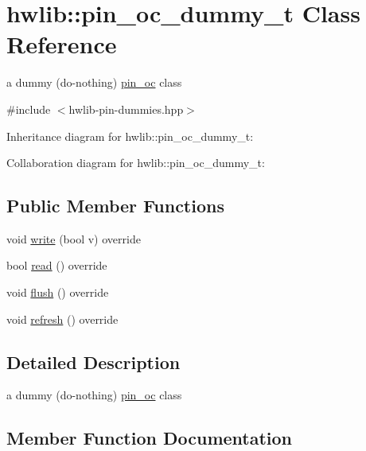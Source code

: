 \hypertarget{classhwlib_1_1pin__oc__dummy__t}{}\section{hwlib\+:\+:pin\+\_\+oc\+\_\+dummy\+\_\+t Class Reference}
\label{classhwlib_1_1pin__oc__dummy__t}


a dummy (do-\/nothing) \hyperlink{classhwlib_1_1pin__oc}{pin\+\_\+oc} class  




{\ttfamily \#include $<$hwlib-\/pin-\/dummies.\+hpp$>$}



Inheritance diagram for hwlib\+:\+:pin\+\_\+oc\+\_\+dummy\+\_\+t\+:


Collaboration diagram for hwlib\+:\+:pin\+\_\+oc\+\_\+dummy\+\_\+t\+:
\subsection*{Public Member Functions}
\begin{DoxyCompactItemize}
\item 
void \hyperlink{classhwlib_1_1pin__oc__dummy__t_a85fd03ccea573743545a33c131d2674d}{write} (bool v) override
\item 
bool \hyperlink{classhwlib_1_1pin__oc__dummy__t_a53c06f28f7885d1bed4d29cb15aa4b33}{read} () override
\item 
void \hyperlink{classhwlib_1_1pin__oc__dummy__t_ab3eb9b3c0a350944f791adf194e2f9ab}{flush} () override
\item 
void \hyperlink{classhwlib_1_1pin__oc__dummy__t_a3609bb12b15736b0ad6d734c1d45ae49}{refresh} () override
\end{DoxyCompactItemize}


\subsection{Detailed Description}
a dummy (do-\/nothing) \hyperlink{classhwlib_1_1pin__oc}{pin\+\_\+oc} class 

\subsection{Member Function Documentation}
\mbox{\label{classhwlib_1_1pin__oc__dummy__t_ab3eb9b3c0a350944f791adf194e2f9ab}} 
